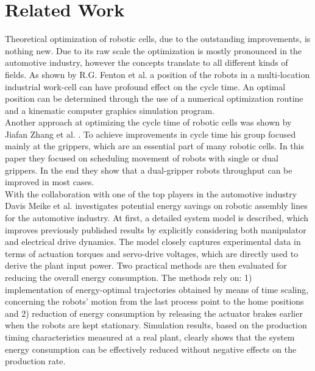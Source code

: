\section{Related Work}

Theoretical optimization of robotic cells, due to the outstanding  improvements, is nothing new. Due to its raw scale the optimization is mostly pronounced in the automotive industry, however the concepts translate to all different kinds of fields. As shown by R.G. Fenton et al. \cite{OptimizationCycleTimeFenton} a position of the robots in a multi-location industrial work-cell can have profound effect on the cycle time. An optimal position  can be determined through the use of a numerical optimization routine and a kinematic computer graphics simulation program. \\

Another approach at optimizing the cycle time of robotic cells was shown by Jiafan Zhang et al. \cite{OptimizationCycleTimeZhang}. To achieve improvements in cycle time his group focused mainly at the grippers, which are an essential part of many robotic cells. In this paper they focused on scheduling movement of robots with single or dual grippers. In the end they show that a dual-gripper robots throughput can be improved in most cases. \\


With the collaboration with one of the top players in the automotive industry Davis Meike et al. \cite{Meike8Percent} investigates potential energy savings on robotic assembly lines for the automotive industry. At first, a detailed system model is described, which improves previously published results by explicitly considering both manipulator and electrical drive dynamics. The model closely captures experimental data in terms of actuation torques and servo-drive voltages, which are directly used to derive the plant input power. Two practical methods are then evaluated for reducing the overall energy consumption. The methods rely on: 1) implementation of energy-optimal trajectories obtained by means of time scaling, concerning the robots' motion from the last process point to the home positions and 2) reduction of energy consumption by releasing the actuator brakes earlier when the robots are kept stationary. Simulation results, based on the production timing characteristics measured at a real plant, clearly shows that the system energy consumption can be effectively reduced without negative effects on the production rate. \\

